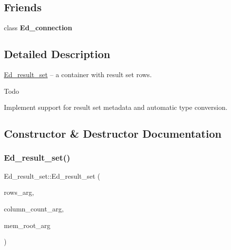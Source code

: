 \subsection*{Friends}
\begin{DoxyCompactItemize}
\item 
\mbox{\label{classEd__result__set_ad9477b51a277c85e69d28ab6d88cc7f6}} 
class {\bfseries Ed\+\_\+connection}
\end{DoxyCompactItemize}


\subsection{Detailed Description}
\mbox{\hyperlink{classEd__result__set}{Ed\+\_\+result\+\_\+set}} -- a container with result set rows. \begin{DoxyRefDesc}{Todo}
\item[\mbox{\hyperlink{todo__todo000113}{Todo}}]Implement support for result set metadata and automatic type conversion. \end{DoxyRefDesc}


\subsection{Constructor \& Destructor Documentation}
\mbox{\label{classEd__result__set_a28ecefda6146f1314328ab6250009b43}} 
\subsubsection{\texorpdfstring{Ed\+\_\+result\+\_\+set()}{Ed\_result\_set()}}
{\footnotesize\ttfamily Ed\+\_\+result\+\_\+set\+::\+Ed\+\_\+result\+\_\+set (\begin{DoxyParamCaption}\item[{\mbox{\hyperlink{classList}{List}}$<$ \mbox{\hyperlink{classEd__row}{Ed\+\_\+row}} $>$ $\ast$}]{rows\+\_\+arg,  }\item[{size\+\_\+t}]{column\+\_\+count\+\_\+arg,  }\item[{M\+E\+M\+\_\+\+R\+O\+OT $\ast$}]{mem\+\_\+root\+\_\+arg }\end{DoxyParamCaption})}

